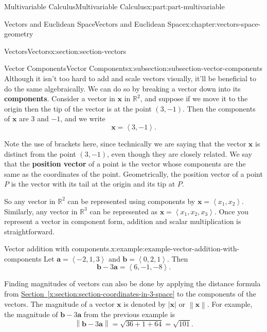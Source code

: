 \documentclass[twoside,10pt,]{book}
\newcommand{\xreffont}{\relax}
\newcommand{\terminology}[1]{\textbf{#1}}
\numberwithin{equation}{part}
\newcommand{\RR}{\mathbb{R}}
\newcommand{\norm}[1]{\left\| #1 \right\|}
\newcommand{\dotprod}[1]{\left\langle #1 \right\rangle}
\begin{document}
\begin{partptx}{Multivariable Calculus}{}{Multivariable Calculus}{}{}{x:part:part-multivariable}
\begin{chapterptx}{Vectors and Euclidean Space}{}{Vectors and Euclidean Space}{}{}{x:chapter:vectors-space-geometry}
\begin{sectionptx}{Vectors}{}{Vectors}{}{}{x:section:section-vectors}
%
\begin{subsectionptx}{Vector Components}{}{Vector Components}{}{}{x:subsection:subsection-vector-components}
Although it isn't too hard to add and scale vectors visually, it'll be beneficial to do the same algebraically. We can do so by breaking a vector down into its \terminology{components}. Consider a vector in \(\mathbf{x}\) in \(\RR^{2}\), and suppose if we move it to the origin then the tip of the vector is at the point \((3,-1)\). Then the components of \(\mathbf{x}\) are \(3\) and \(-1\), and we write%
\begin{equation*}
\mathbf{x} = \dotprod{3,-1}.
\end{equation*}
%
\par
Note the use of brackets here, since technically we are saying that the vector \(\mathbf{x}\) is distinct from the point \((3,-1)\), even though they are closely related. We say that the \terminology{position vector} of a point is the vector whose components are the same as the coordinates of the point. Geometrically, the position vector of a point \(P\) is the vector with its tail at the origin and its tip at \(P\).%
\par
So any vector in \(\RR^{2}\) can be represented using components by \(\mathbf{x} = \dotprod{x_{1},x_{2}}\). Similarly, any vector in \(\RR^{3}\) can be represented as \(\mathbf{x} = \dotprod{x_{1},x_{2},x_{3}}\). Once you represent a vector in component form, addition and scalar multiplication is straightforward.%
\begin{example}{Vector addition with components.}{x:example:example-vector-addition-with-components}%
Let \(\mathbf{a} = \dotprod{-2,1,3}\) and \(\mathbf{b} = \dotprod{0,2,1}\). Then%
%
\begin{equation*}
\mathbf{b}-3\mathbf{a} = \dotprod{6,-1,-8}.
\end{equation*}
\end{example}
Finding magnitudes of vectors can also be done by applying the distance formula from \hyperref[x:section:section-coordinates-in-3-space]{Section~{\xreffont\ref{x:section:section-coordinates-in-3-space}}} to the components of the vectors. The magnitude of a vector \(\mathbf{x}\) is denoted by \(|\mathbf{x}|\) or \(\norm{\mathbf{x}}\). For example, the magnitude of \(\mathbf{b}-3\mathbf{a}\) from the previous example is%
\begin{equation*}
\norm{\mathbf{b}-3\mathbf{a}} = \sqrt{36+1+64} = \sqrt{101}.
\end{equation*}
%
\par

\end{subsectionptx}
\end{sectionptx}
\end{chapterptx}
\end{partptx}
\end{document}
